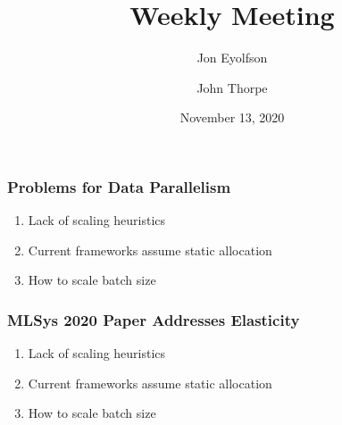 

\title{Weekly Meeting}
\date{November 13, 2020}
\author{Jon Eyolfson \and John Thorpe}



  \begin{frame}[plain]
    \titlepage
  \end{frame}

  \setcounter{framenumber}{0}

  \begin{frame}
    \frametitle{Problems for Data Parallelism}

    \begin{enumerate}
      \item Lack of scaling heuristics
      \vspace{2em}
      \item Current frameworks assume static allocation
      \vspace{2em}
      \item How to scale batch size
    \end{enumerate}
  \end{frame}

  \begin{frame}
    \frametitle{MLSys 2020 Paper Addresses Elasticity}

    \begin{enumerate}
      \item Lack of scaling heuristics

      \vspace{2em}
      \item Current frameworks assume static allocation

      \vspace{2em}
      \item How to scale batch size

    \end{enumerate}
  \end{frame}

